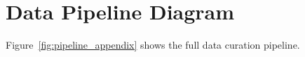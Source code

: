 \section{Data Pipeline Diagram}
\label{app:pipeline-diagram}

Figure~\ref{fig:pipeline_appendix} shows the full data curation pipeline.

